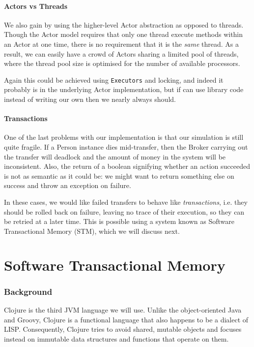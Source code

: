 \documentclass[a4paper,12pt]{kth-mag}
\begin{document}
\subsection{Actors vs Threads}

We also gain by using the higher-level Actor abstraction as opposed to threads. Though the Actor model requires that only one thread execute methods within an Actor at one time, there is no requirement that it is the \textit{same} thread. As a result, we can easily have a crowd of Actors sharing a limited pool of threads, where the thread pool size is optimised for the number of available processors. 

Again this could be achieved using \texttt{Executors} and locking, and indeed it probably is in the underlying Actor implementation, but if can use library code instead of writing our own then we nearly always should.

\subsection{Transactions}

One of the last problems with our implementation is that our simulation is still quite fragile. If a Person instance dies mid-transfer, then the Broker carrying out the transfer will deadlock and the amount of money in the system will be inconsistent.  Also, the return of a boolean signifying whether an action succeeded is not as semantic as it could be: we might want to return something else on success and throw an exception on failure.

In these cases, we would like failed transfers to behave like \textit{transactions}, i.e. they should be rolled back on failure, leaving no trace of their execution, so they can be retried at a later time. This is possible using a system known as Software Transactional Memory (STM), which we will discuss next.

\part{ Software Transactional Memory}

\section{Background}

Clojure is the third JVM language we will use. Unlike the object-oriented Java and Groovy, Clojure is a functional language that also happens to be a dialect of LISP.  Consequently, Clojure tries to avoid shared, mutable objects and focuses instead on immutable data structures and functions that operate on them.
\end{document}
